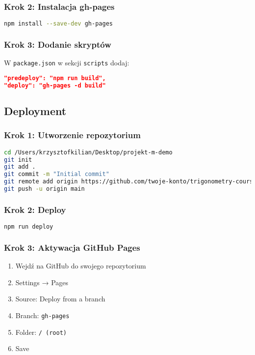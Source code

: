 \documentclass[12pt,a4paper]{article}
\begin{document}
\subsubsection{Krok 2: Instalacja gh-pages}
\begin{lstlisting}[language=bash]
npm install --save-dev gh-pages
\end{lstlisting}

\subsubsection{Krok 3: Dodanie skryptów}
W \texttt{package.json} w sekcji \texttt{scripts} dodaj:
\begin{lstlisting}[language=json]
"predeploy": "npm run build",
"deploy": "gh-pages -d build"
\end{lstlisting}

\subsection{Deployment}

\subsubsection{Krok 1: Utworzenie repozytorium}
\begin{lstlisting}[language=bash]
cd /Users/krzysztofkilian/Desktop/projekt-m-demo
git init
git add .
git commit -m "Initial commit"
git remote add origin https://github.com/twoje-konto/trigonometry-course.git
git push -u origin main
\end{lstlisting}

\subsubsection{Krok 2: Deploy}
\begin{lstlisting}[language=bash]
npm run deploy
\end{lstlisting}

\subsubsection{Krok 3: Aktywacja GitHub Pages}
\begin{enumerate}
    \item Wejdź na GitHub do swojego repozytorium
    \item Settings → Pages
    \item Source: Deploy from a branch
    \item Branch: \texttt{gh-pages}
    \item Folder: \texttt{/ (root)}
    \item Save
\end{enumerate}
\end{document}
